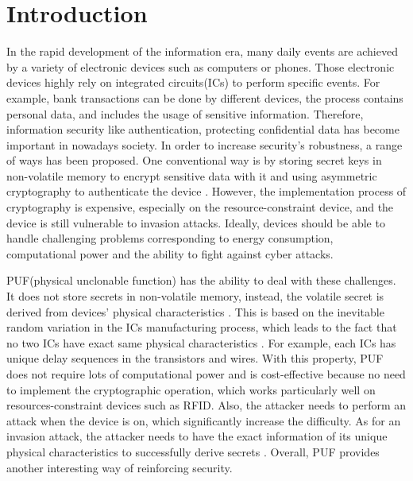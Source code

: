 \chapter{Introduction}
In the rapid development of the information era, many daily events are achieved by a variety of electronic devices such as computers or phones.
Those electronic devices highly rely on integrated circuits(ICs) to perform specific events. For example, bank transactions can be done by different devices,
the process contains personal data, and includes the usage of sensitive information. Therefore, information security like authentication, protecting confidential data
has become important in nowadays society. In order to increase security's robustness, a range of ways has been proposed. One conventional way is by storing secret keys in non-volatile memory to encrypt sensitive data with it
and using asymmetric cryptography to authenticate the device \cite{Reference3}. However, the implementation process of cryptography is expensive, especially on the resource-constraint device, and the device is still vulnerable to invasion attacks. Ideally, devices should be able to handle challenging problems corresponding to energy consumption, 
computational power and the ability to fight against cyber attacks. \par

PUF(physical unclonable function) has the ability to deal with these challenges. It does not store secrets in non-volatile memory, instead, the volatile secret is derived from devices' physical characteristics \cite{Reference3}.
This is based on the inevitable random variation in the ICs manufacturing process, which leads to the fact that no two ICs have exact same physical characteristics \cite{Reference3}. For example, each ICs has unique delay sequences in the transistors and wires.
With this property, PUF does not require lots of computational power and is cost-effective because no need to implement the cryptographic operation, which works particularly well on
resources-constraint devices such as RFID. Also, the attacker needs to perform an attack when the device is on, which significantly increase the difficulty. As for an invasion attack, 
the attacker needs to have the exact information of its unique physical characteristics to successfully derive secrets \cite{Reference3}. Overall, PUF provides another interesting way of reinforcing security.

